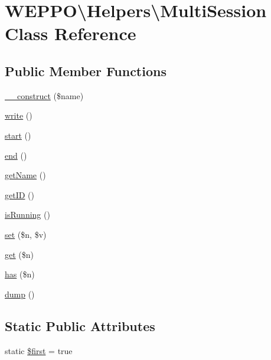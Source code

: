 \hypertarget{classWEPPO_1_1Helpers_1_1MultiSession}{}\section{W\+E\+P\+PO\textbackslash{}Helpers\textbackslash{}Multi\+Session Class Reference}
\label{classWEPPO_1_1Helpers_1_1MultiSession}
\subsection*{Public Member Functions}
\begin{DoxyCompactItemize}
\item 
\hyperlink{classWEPPO_1_1Helpers_1_1MultiSession_a73e90e3bd34487d37ce3cd99744e63c4}{\+\_\+\+\_\+construct} (\$name)
\item 
\hyperlink{classWEPPO_1_1Helpers_1_1MultiSession_a57e21fecb9f906a75a6cbe4fad589f69}{write} ()
\item 
\hyperlink{classWEPPO_1_1Helpers_1_1MultiSession_ad81fa382fa00ea04c7824ce4def022bd}{start} ()
\item 
\hyperlink{classWEPPO_1_1Helpers_1_1MultiSession_ab9fad4174e71cc66cbcf0eee9c578955}{end} ()
\item 
\hyperlink{classWEPPO_1_1Helpers_1_1MultiSession_a999532084df734ac8ad1fcd3c6954180}{get\+Name} ()
\item 
\hyperlink{classWEPPO_1_1Helpers_1_1MultiSession_ab2d6d1948e5a7e2d127160ca98f412fb}{get\+ID} ()
\item 
\hyperlink{classWEPPO_1_1Helpers_1_1MultiSession_ac1f6ebbc3c9bd4cc3ea6ac3afe9295c1}{is\+Running} ()
\item 
\hyperlink{classWEPPO_1_1Helpers_1_1MultiSession_a0921f23ccda22c8be40c58bfcc4a2cd2}{set} (\$n, \$v)
\item 
\hyperlink{classWEPPO_1_1Helpers_1_1MultiSession_a29f51d6a99bb9e3673b206c663985beb}{get} (\$n)
\item 
\hyperlink{classWEPPO_1_1Helpers_1_1MultiSession_a9f6d4bbe654c36b3fcdff2e724137a0e}{has} (\$n)
\item 
\hyperlink{classWEPPO_1_1Helpers_1_1MultiSession_aed3b3c08d685f45d43a5af9d9a1b62df}{dump} ()
\end{DoxyCompactItemize}
\subsection*{Static Public Attributes}
\begin{DoxyCompactItemize}
\item 
static \hyperlink{classWEPPO_1_1Helpers_1_1MultiSession_a1431b5eb9becee142a6b1823a196a2ad}{\$first} = true
\end{DoxyCompactItemize}


